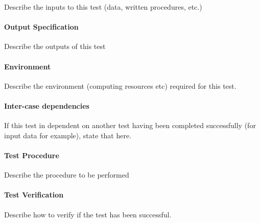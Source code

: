 Describe the inputs to this test (data, written procedures, etc.)

\paragraph{Output Specification}

Describe the outputs of this test

\paragraph{Environment}

Describe the environment (computing resources etc) required for this test.

\paragraph{Inter-case dependencies}

If this test in dependent on another test having been completed successfully (for input data for example), state that here.

\paragraph{Test Procedure}

Describe the procedure to be performed

\paragraph{Test Verification}

Describe how to verify if the test has been successful.

